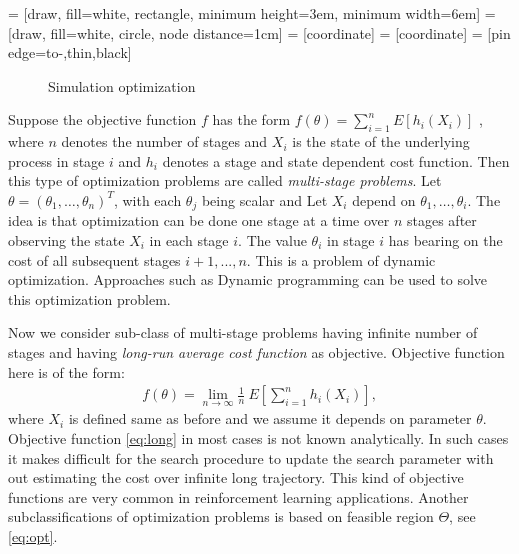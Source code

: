  = [draw, fill=white, rectangle,
   minimum height=3em, minimum width=6em]
 = [draw, fill=white, circle, node distance=1cm]
 = [coordinate]
 = [coordinate]
 = [pin edge={to-,thin,black}]

 \begin{figure}[t]
    \centering
{}
\caption{Simulation optimization}
\label{fig:so}
\end{figure}

Suppose the objective function $f$ has the form $f(\theta) = \sum_{i=1}^{n} E[h_{i}(X_{i})]$ , where $n$ denotes the number of stages and $X_{i}$ is the state of the underlying process in stage $i$ and $h_{i}$ denotes a stage and state dependent cost function. Then this type of optimization problems are called \emph{multi-stage problems}. Let $\theta = (\theta_{1},\ldots,\theta_{n})^{T}$,  with each $\theta_{j}$ being scalar and Let $X_{i}$ depend on $\theta_{1},\ldots,\theta_{i}$. The idea is that optimization can be done one stage at a time over $n$ stages after observing the state $X_{i}$ in each stage $i$. The value $\theta_{i}$ in stage $i$ has bearing on the cost of all subsequent stages $i+1,...,n$. This is  a problem of dynamic optimization. Approaches such as Dynamic programming can be used to solve this optimization problem.\par
Now we consider sub-class of multi-stage problems having infinite number of stages and having \emph{long-run average cost function} as objective. Objective function here is of the form:
\begin{align}\label{eq:long}
 f(\theta) = \lim_{n \to \infty} \frac{1}{n} ~ E \left[ \sum_{i=1}^{n} h_{i}(X_{i})\right ] ,
\end{align}
where $X_{i}$ is defined same as before and we assume it depends on parameter $\theta$. Objective function \eqref{eq:long} in most cases is not known analytically. In such cases it makes difficult for the search procedure to update the search parameter with out estimating the cost over infinite long trajectory. This kind of objective functions are very common in reinforcement learning applications. Another subclassifications of optimization problems is based on feasible region $\Theta$, see \eqref{eq:opt}.

